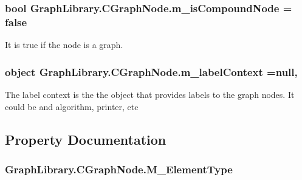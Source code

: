 \subsubsection[{m\+\_\+is\+Compound\+Node}]{\setlength{\rightskip}{0pt plus 5cm}bool Graph\+Library.\+C\+Graph\+Node.\+m\+\_\+is\+Compound\+Node = false\hspace{0.3cm}{\ttfamily [protected]}}\label{class_graph_library_1_1_c_graph_node_aec1f789c7ef7cf0e34d456eb3e7a9ccb}


It is true if the node is a graph. 

\hypertarget{class_graph_library_1_1_c_graph_node_a6778251b91c25126259a1c838324eea4}{}
\subsubsection[{m\+\_\+label\+Context}]{\setlength{\rightskip}{0pt plus 5cm}object Graph\+Library.\+C\+Graph\+Node.\+m\+\_\+label\+Context =null\hspace{0.3cm}{\ttfamily [static]}, {\ttfamily [protected]}}\label{class_graph_library_1_1_c_graph_node_a6778251b91c25126259a1c838324eea4}


The label context is the the object that provides labels to the graph nodes. It could be and algorithm, printer, etc 



\subsection{Property Documentation}
\hypertarget{class_graph_library_1_1_c_graph_node_a1b13fbb13f63117f18610da1fe6b86ac}{}
\subsubsection[{M\+\_\+\+Element\+Type}]{ Graph\+Library.\+C\+Graph\+Node.\+M\+\_\+\+Element\+Type\hspace{0.3cm}{\ttfamily [get]}}\label{class_graph_library_1_1_c_graph_node_a1b13fbb13f63117f18610da1fe6b86ac}


